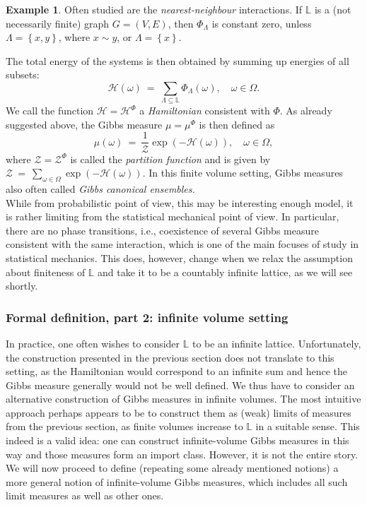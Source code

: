 \documentclass[12pt]{article}
\renewcommand{\H}{\mathcal{H}}
\renewcommand{\L}{\mathbb{L}}
\newcommand{\ZZ}{\mathcal{Z}}
\newcommand{\set}[1]{\left\{#1\right\}}
\newcommand{\1}{\mathbbm{1}}
\newcommand{\5}{\vspace{0.5cm}}
\theoremstyle{definition}
\newtheorem{ex}[thm]{Example}
\begin{document}
\begin{ex}
Often studied are the \textit{nearest-neighbour} interactions. If $\L$ is a (not necessarily finite) graph $G=(V,E)$, then $\Phi_\Lambda$ is constant zero, unless $\Lambda=\set{x,y}$, where $x\sim y$, or $\Lambda=\set{x}$.
\end{ex}

The total energy of the systems is then obtained by summing up energies of all subsets:
$$\H(\omega) ~=~ \sum_{\Lambda\subseteq \L}\Phi_\Lambda(\omega), \quad \omega\in\Omega.$$
We call the function $\H=\H^\Phi$ a \textit{Hamiltonian} consistent with $\Phi$. As already suggested above, the Gibbs measure $\mu=\mu^\Phi$ is then defined as
$$\mu(\omega) ~=~ \frac{1}{\ZZ}\exp(-\H(\omega)), \quad \omega\in\Omega,$$
where $\ZZ=\ZZ^\Phi$ is called the \textit{partition function} and is given by $\ZZ ~=~ \sum_{\omega\in\Omega}\exp(-\H(\omega)).$ In this finite volume setting, Gibbs measures also often called \textit{Gibbs canonical ensembles.} \\

While from probabilistic point of view, this may be interesting enough model, it is rather limiting from the statistical mechanical point of view. In particular, there are no phase transitions, i.e., coexistence of several Gibbs measure consistent with the same interaction, which is one of the main focuses of study in statistical mechanics. This does, however, change when we relax the assumption about finiteness of $\L$ and take it to be a countably infinite lattice, as we will see shortly.


\subsubsection{Formal definition, part 2: infinite volume setting}

In practice, one often wishes to consider $\L$ to be an infinite lattice. Unfortunately, the construction presented in the previous section does not translate to this setting, as the Hamiltonian would correspond to an infinite sum and hence the Gibbs measure generally would not be well defined. We thus have to consider an alternative construction of Gibbs measures in infinite volumes. The most intuitive approach perhaps appears to be to construct them as (weak) limits of measures from the previous section, as finite volumes increase to $\L$ in a suitable sense. This indeed is a valid idea: one can construct infinite-volume Gibbs measures in this way and those measures form an import class. However, it is not the entire story. We will now proceed to define (repeating some already mentioned notions) a more general notion of infinite-volume Gibbs measures, which includes all such limit measures as well as other ones. \\
\end{document}
